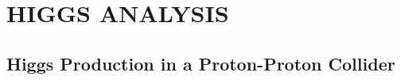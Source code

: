 %
%
%



\chapter{\uppercase {Higgs Analysis}}
\label{ch:analysis}



\section{Higgs Production in a Proton-Proton Collider}
\label{sec:higgs_production}

